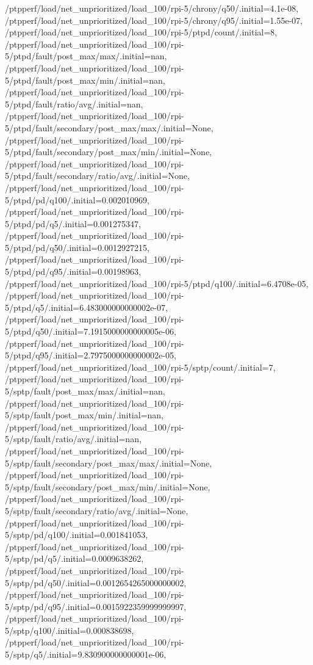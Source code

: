 {    /ptpperf/load/net_unprioritized/load_100/rpi-5/chrony/q50/.initial=4.1e-08,
    /ptpperf/load/net_unprioritized/load_100/rpi-5/chrony/q95/.initial=1.55e-07,
    /ptpperf/load/net_unprioritized/load_100/rpi-5/ptpd/count/.initial=8,
    /ptpperf/load/net_unprioritized/load_100/rpi-5/ptpd/fault/post_max/max/.initial=nan,
    /ptpperf/load/net_unprioritized/load_100/rpi-5/ptpd/fault/post_max/min/.initial=nan,
    /ptpperf/load/net_unprioritized/load_100/rpi-5/ptpd/fault/ratio/avg/.initial=nan,
    /ptpperf/load/net_unprioritized/load_100/rpi-5/ptpd/fault/secondary/post_max/max/.initial=None,
    /ptpperf/load/net_unprioritized/load_100/rpi-5/ptpd/fault/secondary/post_max/min/.initial=None,
    /ptpperf/load/net_unprioritized/load_100/rpi-5/ptpd/fault/secondary/ratio/avg/.initial=None,
    /ptpperf/load/net_unprioritized/load_100/rpi-5/ptpd/pd/q100/.initial=0.002010969,
    /ptpperf/load/net_unprioritized/load_100/rpi-5/ptpd/pd/q5/.initial=0.001275347,
    /ptpperf/load/net_unprioritized/load_100/rpi-5/ptpd/pd/q50/.initial=0.0012927215,
    /ptpperf/load/net_unprioritized/load_100/rpi-5/ptpd/pd/q95/.initial=0.00198963,
    /ptpperf/load/net_unprioritized/load_100/rpi-5/ptpd/q100/.initial=6.4708e-05,
    /ptpperf/load/net_unprioritized/load_100/rpi-5/ptpd/q5/.initial=6.483000000000002e-07,
    /ptpperf/load/net_unprioritized/load_100/rpi-5/ptpd/q50/.initial=7.1915000000000005e-06,
    /ptpperf/load/net_unprioritized/load_100/rpi-5/ptpd/q95/.initial=2.7975000000000002e-05,
    /ptpperf/load/net_unprioritized/load_100/rpi-5/sptp/count/.initial=7,
    /ptpperf/load/net_unprioritized/load_100/rpi-5/sptp/fault/post_max/max/.initial=nan,
    /ptpperf/load/net_unprioritized/load_100/rpi-5/sptp/fault/post_max/min/.initial=nan,
    /ptpperf/load/net_unprioritized/load_100/rpi-5/sptp/fault/ratio/avg/.initial=nan,
    /ptpperf/load/net_unprioritized/load_100/rpi-5/sptp/fault/secondary/post_max/max/.initial=None,
    /ptpperf/load/net_unprioritized/load_100/rpi-5/sptp/fault/secondary/post_max/min/.initial=None,
    /ptpperf/load/net_unprioritized/load_100/rpi-5/sptp/fault/secondary/ratio/avg/.initial=None,
    /ptpperf/load/net_unprioritized/load_100/rpi-5/sptp/pd/q100/.initial=0.001841053,
    /ptpperf/load/net_unprioritized/load_100/rpi-5/sptp/pd/q5/.initial=0.0009638262,
    /ptpperf/load/net_unprioritized/load_100/rpi-5/sptp/pd/q50/.initial=0.0012654265000000002,
    /ptpperf/load/net_unprioritized/load_100/rpi-5/sptp/pd/q95/.initial=0.0015922359999999997,
    /ptpperf/load/net_unprioritized/load_100/rpi-5/sptp/q100/.initial=0.000838698,
    /ptpperf/load/net_unprioritized/load_100/rpi-5/sptp/q5/.initial=9.830900000000001e-06,
}
